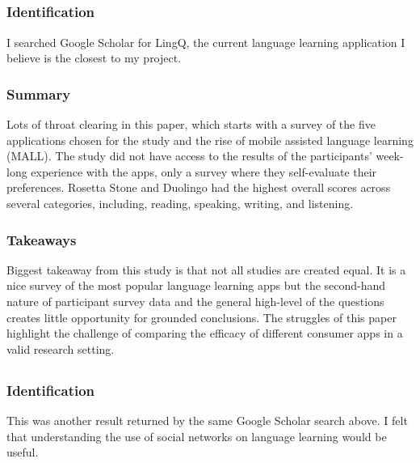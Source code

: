 \documentclass[
	letterpaper, %
]{jdf}
\begin{document}
\subsection{}
\subsubsection{Identification}
I searched Google Scholar for LingQ, the current language learning application I believe is the closest to my project.

\subsubsection{Summary}
Lots of throat clearing in this paper, which starts with a survey of the five applications chosen for the study and the rise of mobile assisted language learning (MALL). The study did not have access to the results of the participants' week-long experience with the apps, only a survey where they self-evaluate their preferences. Rosetta Stone and Duolingo had the highest overall scores across several categories, including, reading, speaking, writing, and listening.

\subsubsection{Takeaways}
Biggest takeaway from this study is that not all studies are created equal. It is a nice survey of the most popular language learning apps but the second-hand nature of participant survey data and the general high-level of the questions creates little opportunity for grounded conclusions. The struggles of this paper highlight the challenge of comparing the efficacy of different consumer apps in a valid research setting. 

\subsection{}
\subsubsection{Identification}
This was another result returned by the same Google Scholar search above. I felt that understanding the use of social networks on language learning would be useful.
\end{document}
